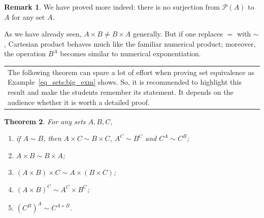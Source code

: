 \documentclass[12pt,notitlepage]{article}
\theoremstyle{plain}
\newtheorem{thm}{Theorem}[section]
\theoremstyle{definition}
\newtheorem{rem}[thm]{Remark}
\theoremstyle{plain}
\newcommand{\mP}{\mathcal{P}}
\newcommand{\1}{\mathbf{1}}
\newcommand{\0}{\mathbf{0}}
\newcommand{\mcomm}[1]{
\medskip\noindent\begin{tabular}{| l}
\parbox{0.99\textwidth}{{\small
#1 }}\end{tabular}
\smallskip}
\begin{document}
\begin{rem}
We have proved more indeed: there is no surjection from $\mP(A)$ to $A$ for any set $A$.
\end{rem}

As we have already seen, $A \times B \neq B \times A$ generally. But if one replaces ${=}$ with ${\sim}$, Cartesian product behaves much like the familiar numerical product; moreover, the operation $B^A$ becomes similar to numerical exponentiation.

\mcomm{The following theorem can spare a lot of effort when proving set equivalence as Example~\ref{eq_sets:big_exm} shows. So, it is recommended to highlight this result and make the students remember its statement. It depends on the audience whether it is worth a detailed proof.}
\begin{thm}\label{ch0:bi_power}
For any sets $A, B, C$,
\begin{enumerate}
\item if $A \sim B$, then $A \times C \sim B \times C$, $A^C \sim B^C$ and $C^A \sim C^B$;
\item $A \times B \sim B \times A$;
\item $(A \times B) \times C \sim A \times (B \times C)$;
\item $(A\times B)^C \sim A^C \times B^C$;
\item $(C^B)^A \sim C^{A \times B}$.
\end{enumerate}
\end{thm}
\end{document}
